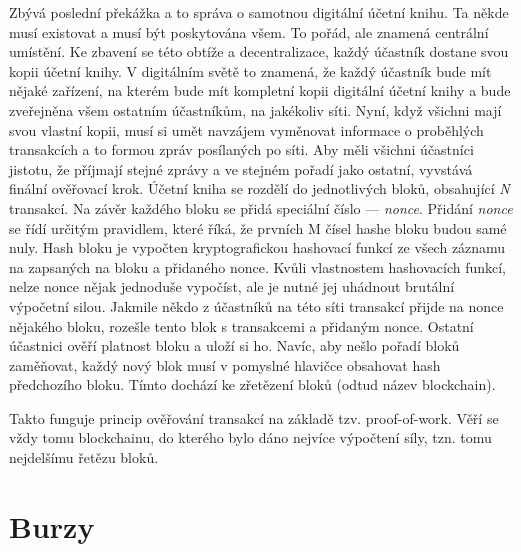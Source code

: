 Zbývá poslední překážka a to správa o samotnou digitální účetní knihu. Ta někde musí existovat a musí být poskytována všem. To pořád, ale
znamená centrální umístění. Ke zbavení se této obtíže a decentralizace, každý účastník dostane svou kopii účetní knihy. V digitálním světě to znamená, že
každý účastník bude mít nějaké zařízení, na kterém bude mít kompletní kopii digitální účetní knihy a bude zveřejněna všem ostatním účastníkům,
na jakékoliv síti. Nyní, když všichni mají svou vlastní kopii, musí si umět navzájem vyměnovat informace o proběhlých transakcích a to formou
zpráv posílaných po síti. Aby měli všichni účastníci jistotu, že příjmají stejné zprávy a ve stejném pořadí jako ostatní, vyvstává finální
ověřovací krok. Účetní kniha se rozdělí do jednotlivých bloků, obsahující \emph{N} transakcí. Na závěr každého bloku se přidá speciální
číslo --- \emph{nonce}. Přidání \emph{nonce} se řídí určitým pravidlem, které říká, že prvních M čísel hashe bloku budou samé nuly.
Hash bloku je vypočten kryptografickou hashovací funkcí ze všech záznamu na zapsaných na bloku a přidaného nonce. Kvůli vlastnostem hashovacích
funkcí, nelze nonce nějak jednoduše vypočíst, ale je nutné jej uhádnout brutální výpočetní silou. Jakmile někdo z účastníků na této síti
transakcí přijde na nonce nějakého bloku, rozešle tento blok s transakcemi a přidaným nonce. Ostatní účastnici ověří platnost bloku
a uloží si ho. Navíc, aby nešlo pořadí bloků zaměňovat, každý nový blok musí v pomyslné hlavičce obsahovat hash předchozího bloku.
Tímto dochází ke zřetězení bloků (odtud název blockchain).

Takto funguje princip ověřování transakcí na základě tzv. proof-of-work. Věří se vždy tomu blockchainu, do kterého bylo dáno nejvíce
výpočtení síly, tzn. tomu nejdelšímu řetězu bloků.



\section{Burzy}
\label{sec:Exchanges}

\endinput